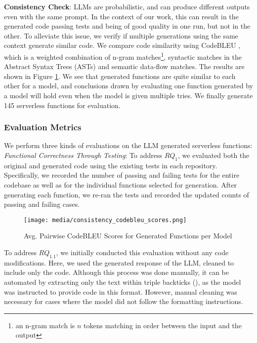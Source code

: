 \noindent
\textbf{Consistency Check}: LLMs are probabilistic, and can produce different outputs even with the same prompt. In the context of our work, this can result in the generated code passing tests and being of good quality in one run, but not in the other. To alleviate this issue, we verify if multiple generations using the same context generate similar code. We compare code similarity using CodeBLEU \cite{ren2020codebleu}, which is a weighted combination of n-gram matches\footnote{\scriptsize an n-gram match is $n$ tokens matching in order between the input and the output}, syntactic matches in the Abstract Syntax Trees (ASTs) and semantic data-flow matches. The results 
are shown in Figure \ref{fig:codebleu-consistency}. We see that generated functions are quite similar to each other for a model, and conclusions drawn by evaluating one function generated by a model will hold even when the model is given multiple tries.
We finally generate 145 serverless functions for evaluation.   






\subsubsection{Evaluation Metrics} \label{study:eval}
We perform three kinds of evaluations on the LLM generated serverless functions:\\
\textit{Functional Correctness Through Testing}: To address $RQ_{1}$, we evaluated both the original and generated code using the existing tests in each repository. Specifically, we recorded the number of passing and failing tests for the entire codebase as well as for the individual functions selected for generation. After generating each function, we re-ran the tests and recorded the updated counts of passing and failing cases.

\begin{figure}[t]
    \centering
    \texttt{[image: media/consistency\_codebleu\_scores.png]}
    \vspace{-9pt}
    \caption{Avg. Pairwise CodeBLEU Scores for Generated Functions per Model}
    \label{fig:codebleu-consistency}
    \vspace{-15pt}
\end{figure}

To address $RQ_{1.1}$, we initially conducted this evaluation without any code modifications. Here, we used the generated response of the LLM, cleaned to include only the code. Although this process was done manually, it can be automated by extracting only the text within triple backticks (\texttt{\textasciigrave \textasciigrave \textasciigrave}), as the model was instructed to provide code in this format. However, manual cleaning was necessary for cases where the model did not follow the formatting instructions.

